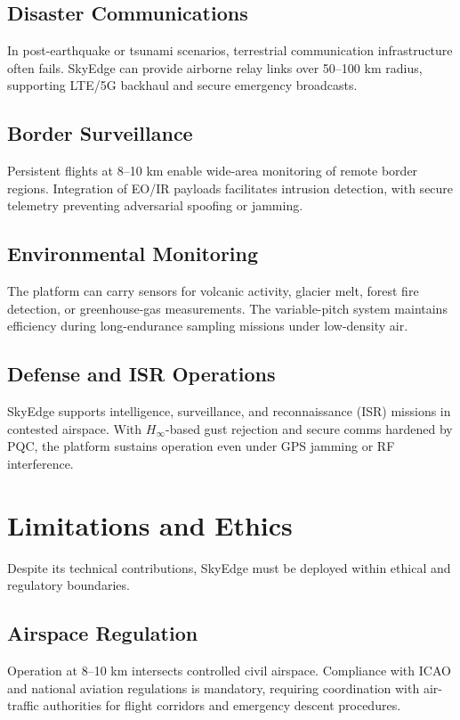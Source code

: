 \documentclass[conference]{IEEEtran}
\begin{document}
\subsection{Disaster Communications}
In post-earthquake or tsunami scenarios, terrestrial communication
infrastructure often fails. SkyEdge can provide airborne relay links
over 50--100 km radius, supporting LTE/5G backhaul and secure emergency
broadcasts.  

\subsection{Border Surveillance}
Persistent flights at 8--10 km enable wide-area monitoring of remote
border regions. Integration of EO/IR payloads facilitates intrusion
detection, with secure telemetry preventing adversarial spoofing or
jamming.  

\subsection{Environmental Monitoring}
The platform can carry sensors for volcanic activity, glacier melt,
forest fire detection, or greenhouse-gas measurements. The variable-pitch
system maintains efficiency during long-endurance sampling missions
under low-density air.  

\subsection{Defense and ISR Operations}
SkyEdge supports intelligence, surveillance, and reconnaissance (ISR)
missions in contested airspace. With $H_\infty$-based gust rejection and
secure comms hardened by PQC, the platform sustains operation even under
GPS jamming or RF interference.  

\section{Limitations and Ethics}
Despite its technical contributions, SkyEdge must be deployed within
ethical and regulatory boundaries.  

\subsection{Airspace Regulation}
Operation at 8--10 km intersects controlled civil airspace. Compliance
with ICAO and national aviation regulations is mandatory, requiring
coordination with air-traffic authorities for flight corridors and
emergency descent procedures.  
\end{document}
